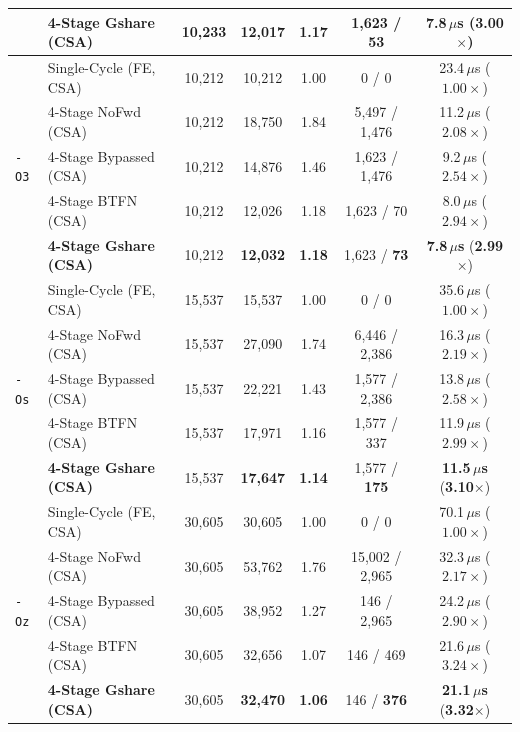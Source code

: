 \begin{table}[htbp]
{\begin{tabular}{|l|l|c|c|c|c|c|}
 & \textbf{4-Stage Gshare (CSA)} & 10,233    & \textbf{12,017} & \textbf{1.17} & 1,623 / \textbf{53} & \textbf{7.8\,$\mu$s} (\textbf{3.00$\times$}) \\
\hline
\multirow{5}{*}{\texttt{-O3}} 
 & Single-Cycle (FE, CSA) & 10,212    & 10,212    & 1.00 & 0 / 0             & 23.4\,$\mu$s ($1.00\times$) \\
 & 4-Stage NoFwd (CSA)    & 10,212    & 18,750    & 1.84 & 5,497 / 1,476     & 11.2\,$\mu$s ($2.08\times$) \\
 & 4-Stage Bypassed (CSA) & 10,212    & 14,876    & 1.46 & 1,623 / 1,476     & 9.2\,$\mu$s ($2.54\times$) \\
 & 4-Stage BTFN (CSA)     & 10,212    & 12,026    & 1.18 & 1,623 / 70        & 8.0\,$\mu$s ($2.94\times$) \\
 & \textbf{4-Stage Gshare (CSA)} & 10,212    & \textbf{12,032} & \textbf{1.18} & 1,623 / \textbf{73} & \textbf{7.8\,$\mu$s} (\textbf{2.99$\times$}) \\
\hline
\multirow{5}{*}{\texttt{-Os}} 
 & Single-Cycle (FE, CSA) & 15,537    & 15,537    & 1.00 & 0 / 0             & 35.6\,$\mu$s ($1.00\times$) \\
 & 4-Stage NoFwd (CSA)    & 15,537    & 27,090    & 1.74 & 6,446 / 2,386     & 16.3\,$\mu$s ($2.19\times$) \\
 & 4-Stage Bypassed (CSA) & 15,537    & 22,221    & 1.43 & 1,577 / 2,386     & 13.8\,$\mu$s ($2.58\times$) \\
 & 4-Stage BTFN (CSA)     & 15,537    & 17,971    & 1.16 & 1,577 / 337       & 11.9\,$\mu$s ($2.99\times$) \\
 & \textbf{4-Stage Gshare (CSA)} & 15,537    & \textbf{17,647} & \textbf{1.14} & 1,577 / \textbf{175} & \textbf{11.5\,$\mu$s} (\textbf{3.10$\times$}) \\
\hline
\multirow{5}{*}{\texttt{-Oz}} 
 & Single-Cycle (FE, CSA) & 30,605    & 30,605    & 1.00 & 0 / 0             & 70.1\,$\mu$s ($1.00\times$) \\
 & 4-Stage NoFwd (CSA)    & 30,605    & 53,762    & 1.76 & 15,002 / 2,965    & 32.3\,$\mu$s ($2.17\times$) \\
 & 4-Stage Bypassed (CSA) & 30,605    & 38,952    & 1.27 & 146 / 2,965       & 24.2\,$\mu$s ($2.90\times$) \\
 & 4-Stage BTFN (CSA)     & 30,605    & 32,656    & 1.07 & 146 / 469         & 21.6\,$\mu$s ($3.24\times$) \\
 & \textbf{4-Stage Gshare (CSA)} & 30,605    & \textbf{32,470} & \textbf{1.06} & 146 / \textbf{376} & \textbf{21.1\,$\mu$s} (\textbf{3.32$\times$}) \\

\end{tabular}}
\end{table}
